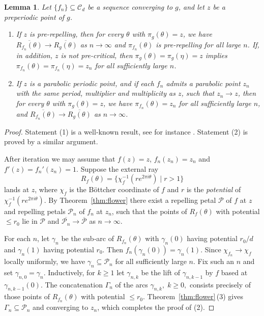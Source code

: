 \documentclass[a4paper,reqno,times, 11pt]{amsart}
\newtheorem{lemma}[theorem]{Lemma}
\theoremstyle{remark}
\theoremstyle{plain}
\numberwithin{equation}{section}
\def\PPP{{\cal P}}
\def\CCCC{\mathscr C}
\def\cal{\mathcal}
\begin{document}
	
\begin{lemma}\label{lem:stable}
Let $\{f_n\}\subseteq\CCCC_d$ be a sequence converging to $g$, and let $z$ be a preperiodic point of $g$.
\begin{enumerate}
\item If $z$ is pre-repelling, then for every $\theta$ with $\pi_g(\theta)=z$, we have  $\overline{R_{f_n}(\theta)}\to\overline{R_g(\theta)}$ as $n\to\infty$ and  $\pi_{f_n}(\theta)$ is pre-repelling for all large $n$. If, in addition, $z$ is not pre-critical, then  $\pi_g(\theta)=\pi_g(\eta)=z$ implies $\pi_{f_n}(\theta)=\pi_{f_n}(\eta)=z_n$ for all sufficiently large $n$.\vspace{2pt}

\item If $z$ is a parabolic periodic point, and if each $f_n$ admits a parabolic point $z_n$ with the same period, multiplier and multiplicity as $z$, such that $z_n\to z$, then for every $\theta$ with $\pi_g(\theta)=z$, we have $\pi_{f_n}(\theta)=z_n$ for all sufficiently large $n$, and $\overline{R_{f_n}(\theta)}\to\overline{R_g(\theta)}$ as $n\to\infty$.
\end{enumerate}\end{lemma}
	\begin{proof}
Statement (1) is a well‑known result, see for instance \cite[Proposition 8.1]{DH1}. Statement (2) is proved by a similar argument.

After iteration we may assume that \(f(z)=z\), \(f_n(z_n)=z_n\) and \(f'(z)=f_n'(z_n)=1\).  
Suppose the external ray  
\[
R_f(\theta)=\{\chi_f^{-1}(re^{2\pi i\theta})\mid r>1\}
\]  
lands at \(z\), where \(\chi_f\) is the Böttcher coordinate of \(f\) and \(r\) is the \emph{potential} of \(\chi_f^{-1}(re^{2\pi i\theta})\).  
By Theorem~\ref{thm:flower} there exist a repelling petal \(\PPP\) of \(f\) at \(z\) and repelling petals \(\PPP_n\) of \(f_n\) at \(z_n\), such that the points of \(R_f(\theta)\) with potential \(\le r_0\) lie in \(\PPP\) and \(\overline{\PPP_n}\to\overline{\PPP}\) as \(n\to\infty\).

For each \(n\), let \(\gamma_n\) be the sub‑arc of \(R_{f_n}(\theta)\) with \(\gamma_n(0)\) having potential \(r_0/d\) and \(\gamma_n(1)\) having potential \(r_0\). Then \(f_n(\gamma_n(0))=\gamma_n(1)\). Since \(\chi_{f_n}\to\chi_f\) locally uniformly, we have \(\gamma_n\subseteq\PPP_n\) for all sufficiently large \(n\).  
Fix such an \(n\) and set \(\gamma_{n,0}=\gamma_n\). Inductively, for \(k\ge1\) let \(\gamma_{n,k}\) be the lift of \(\gamma_{n,k-1}\) by \(f\) based at \(\gamma_{n,k-1}(0)\). The concatenation \(\Gamma_n\) of the arcs \(\gamma_{n,k},\;k\ge0,\) consists precisely of those points of \(R_{f_n}(\theta)\) with potential \(\le r_0\). Theorem~\ref{thm:flower}\,(3) gives \(\Gamma_n\subseteq\PPP_n\) and converging to $z_n$, which completes the proof of (2).
\end{proof}
\end{document}
